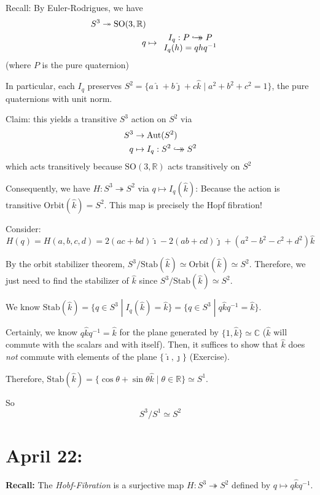 \documentclass[12pt]{article}
\renewcommand{\hat}[1]{\widehat{#1}}
\newcommand{\R}{\mathbb{R}}
\newcommand{\C}{\mathbb{C}}
\newcommand{\SO}{\text{SO}}
\newcommand{\biject}{\hookrightarrow \hspace{-8pt} \rightarrow}
\newcommand{\Aut}{\text{Aut}}
\newcommand{\ihat}{\hat{\imath}}
\newcommand{\jhat}{\hat{\jmath}}
\newcommand{\khat}{\hat{k}}
\begin{document}
    Recall: By Euler-Rodrigues, we have
    \[\begin{aligned}
        S^3 \twoheadrightarrow \SO(3, \R)\\ 
        q &\mapsto \begin{array}{c}
            I_q: P \biject P\\ 
            I_q(h) = qhq^{-1}
        \end{array}
    \end{aligned}\] 
    (where $P$ is the pure quaternion) 

    In particular, each $I_q$ preserves $S^2 = \{a \ihat + b\jhat + c\khat \; | \; a^2 + b^2 + c^2 = 1\}$, the pure quaternions with unit norm. 

    Claim: this yields a transitive $S^3$ action on $S^2$ via 
    \[\begin{aligned}
        S^3 &\to \Aut(S^2)\\ 
        q &\mapsto I_q: S^2 \biject S^2
    \end{aligned}\]
    which acts transitively because $\SO(3, \R)$ acts transitively on $S^2$ 

    Consequently, we have $H: S^3 \twoheadrightarrow S^2$ via $q \mapsto I_q(\khat)$: Because the action is transitive $\text{Orbit}(\khat) = S^2$. This map is precisely the Hopf fibration!

    Consider:  
    \[H(q) = H(a, b, c, d) = 2(ac + bd)\ihat - 2(ab + cd)\jhat + (a^2 - b^2 - c^2 + d^2)\khat\]

    By the orbit stabilizer theorem, $S^3/\text{Stab}(\khat) \simeq \text{Orbit}(\khat) \simeq S^2$. Therefore, we just need to find the stabilizer of $\khat$ since $S^3/\text{Stab}(\khat) \simeq S^2$. 

    We know $\text{Stab}(\khat) = \{q \in S^3 \; | \; I_q(\khat) = \khat\} = \{q \in S^3 \; | \; q\khat q^{-1} = \khat\}$. 

    Certainly, we know $q\khat q^{-1} = \khat$ for the plane generated by $\{1, \khat\} \simeq \C$ ($\khat$ will commute with the scalars and with itself). Then, it suffices to show that $\khat$ does \emph{not} commute with elements of the plane $\{\ihat, \jhat\}$ (Exercise). 

    Therefore, $\text{Stab}(\khat)= \{\cos\theta + \sin\theta \khat \; | \; \theta \in \R\} \simeq S^1$. 

    So 
    \[S^3/S^1 \simeq S^2\]

\section{April 22:}
    \textbf{Recall:} The \emph{Hobf-Fibration} is a surjective map $H: S^3 \twoheadrightarrow S^2$ defined by $q \mapsto q\khat q^{-1}$. 
\end{document}
